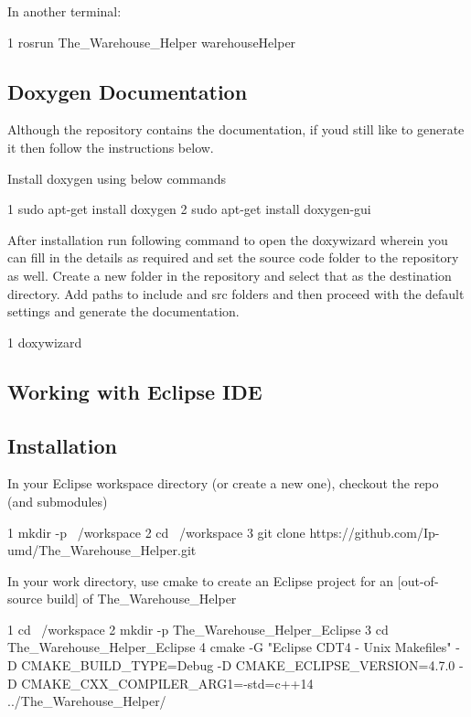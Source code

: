 In another terminal\+: 
\begin{DoxyCode}
1 rosrun The\_Warehouse\_Helper warehouseHelper
\end{DoxyCode}


\subsection*{Doxygen Documentation}

Although the repository contains the documentation, if you\textquotesingle{}d still like to generate it then follow the instructions below.

Install doxygen using below commands 
\begin{DoxyCode}
1 sudo apt-get install doxygen
2 sudo apt-get install doxygen-gui
\end{DoxyCode}
 After installation run following command to open the doxywizard wherein you can fill in the details as required and set the source code folder to the repository as well. Create a new folder in the repository and select that as the destination directory. Add paths to include and src folders and then proceed with the default settings and generate the documentation. 
\begin{DoxyCode}
1 doxywizard
\end{DoxyCode}


\subsection*{Working with Eclipse I\+DE}

\subsection*{Installation}

In your Eclipse workspace directory (or create a new one), checkout the repo (and submodules)


\begin{DoxyCode}
1 mkdir -p ~/workspace
2 cd ~/workspace
3 git clone https://github.com/Ip-umd/The\_Warehouse\_Helper.git
\end{DoxyCode}


In your work directory, use cmake to create an Eclipse project for an \mbox{[}out-\/of-\/source build\mbox{]} of The\+\_\+\+Warehouse\+\_\+\+Helper


\begin{DoxyCode}
1 cd ~/workspace
2 mkdir -p The\_Warehouse\_Helper\_Eclipse
3 cd The\_Warehouse\_Helper\_Eclipse
4 cmake -G "Eclipse CDT4 - Unix Makefiles" -D CMAKE\_BUILD\_TYPE=Debug -D CMAKE\_ECLIPSE\_VERSION=4.7.0 -D
       CMAKE\_CXX\_COMPILER\_ARG1=-std=c++14 ../The\_Warehouse\_Helper/
\end{DoxyCode}
 